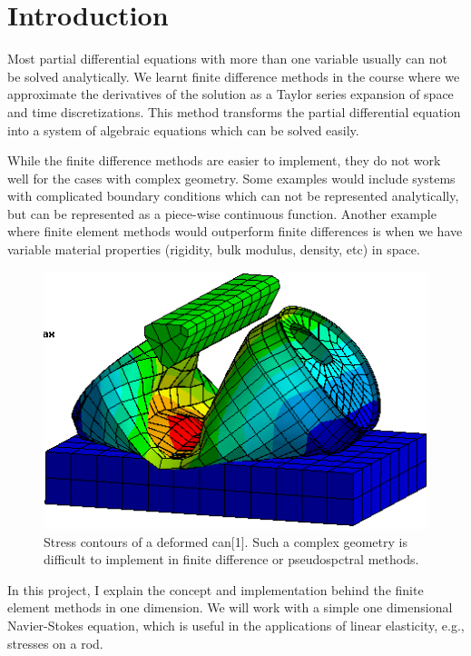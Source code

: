 \documentclass{article}
\begin{document}
\section{Introduction}
Most partial differential equations with more than one variable usually can not be solved analytically. We learnt finite difference methods in the course where we approximate the derivatives of the solution as a Taylor series expansion of space and time discretizations. This method transforms the partial differential equation into a system of algebraic equations which can be solved easily. 

While the finite difference methods are easier to implement, they do not work well for the cases with complex geometry. Some examples would include systems with complicated boundary conditions which can not be represented analytically, but can be represented as a piece-wise continuous function. Another example where finite element methods would outperform finite differences is when we have variable material properties (rigidity, bulk modulus, density, etc) in space.

\begin{figure}[!htb]
    \centering
    \includegraphics[scale=0.5]{fig1.png}
    \caption{Stress contours of a deformed can[1]. Such a complex geometry is difficult to implement in finite difference or pseudospctral methods.}
\end{figure}

In this project, I explain the concept and implementation behind the finite element methods in one dimension. We will work with a simple one dimensional Navier-Stokes equation, which is useful in the applications of linear elasticity, e.g., stresses on a rod.
\end{document}
